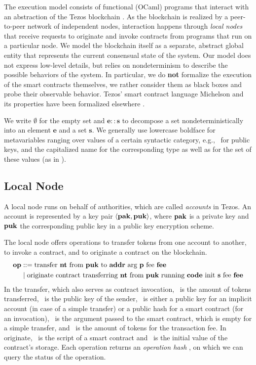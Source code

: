 \documentclass[runningheads]{llncs}
\begin{document}
The execution model consists of functional (OCaml) programs that
interact with an abstraction of the Tezos blockchain
\cite{tezos-whitepaper}. As the blockchain is realized by a
peer-to-peer network of 
independent nodes, interaction happens through
\emph{local nodes} that receive requests to originate and invoke
contracts from programs that run on a particular node. We model the blockchain
itself as a separate, abstract global entity that represents the
current consensual state of the system. Our model does not express
low-level details, but relies on nondeterminism to describe
the possible behaviors of the system. In particular, we do
\textbf{not} formalize the execution of the smart contracts
themselves, we rather consider them as black boxes and probe their
observable behavior. Tezos' smart contract language Michelson and its
properties have been formalized elsewhere \cite{DBLP:conf/fm/BernardoCHPT19}.

We write $\emptyset$ for the empty set and $\mathbf{e :: s}$ to
decompose a set nondeterministically into an element $\mathbf{e}$ and a set
$\mathbf{s}$. We generally use lowercase boldface for metavariables
ranging over values of a certain syntactic category, e.g., \PUK\ for
public keys, and the capitalized name for the
corresponding type as well as for the set of these values (as in \TPUK).

\subsection{Local Node}
\label{sec:local-node}

A local node runs on behalf of authorities, which are called
\emph{accounts} in Tezos. An account is represented by a key pair $\Angle{
  \PAK, \PUK
} $, where $\PAK$ is a private key and $\PUK$ the corresponding public
key in a public key encryption scheme.

The local node offers operations to transfer tokens from one account
to another, to invoke a contract, and to originate a contract on the blockchain.
\begin{align*}
  \OP &::= \TRANSFER[\PARAMETER]\NTEZ\PUK\ADDR\MTEZ
  \\&\mid \ORIGINATE\NTEZ\PUK\CODE\INIT\MTEZ
\end{align*}
In the transfer, which also serves as contract invocation, \NTEZ\ is the amount of tokens transferred, \PUK\ is the public key of the
sender, \ADDR\ is either a public 
key for an implicit account (in case of a simple transfer)  or a
public hash for a smart contract (for an invocation), \PARAMETER\ is
the argument passed to the smart contract, 
which is empty for a simple transfer, and \MTEZ\ is
the amount of tokens for the transaction fee. In originate,  \CODE\ is
the script of a smart contract and \INIT\ is the initial value of the
contract's storage. Each operation returns an \emph{operation hash}
\OPH, on which we can query the status of the operation.
\end{document}

